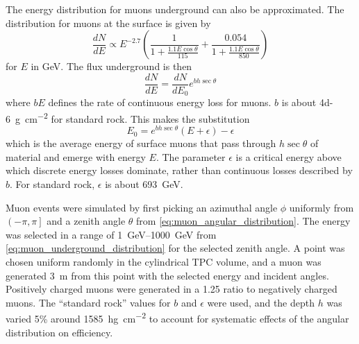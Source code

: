 \documentclass[herrin-thesis.tex]{subfiles}
\begin{document}
The energy distribution for muons underground can also be approximated\cite{Gaisser:1990kx}. The distribution for muons at the surface is given by
\begin{equation}
\label{eq:muon_surface_distribution}
\frac{dN}{dE} \propto E^{-2.7}\left(\frac{1}{1+\frac{1.1 E \cos \theta}{115}} + \frac{0.054}{1+\frac{1.1 E \cos \theta}{850}}\right)
\end{equation}
for \(E\) in \si{\GeV}. The flux underground is then
\begin{equation}
\label{eq:muon_underground_distribution}
\frac{dN}{dE} = \frac{dN}{dE_0}e^{b h \sec \theta}
\end{equation}
where \(b E\) defines the rate of continuous energy loss for muons. \(b\) is about \SI{4d-6}{\g\per\square\cm} for standard rock. This makes the substitution
\begin{equation}
\label{eq:muon_E0_def}
E_0 = e^{b h \sec \theta}\left(E + \epsilon\right) - \epsilon
\end{equation}
which is the average energy of surface muons that pass through \(h\sec\theta\) of material and emerge with energy \(E\). The parameter \(\epsilon\) is a critical energy above which discrete energy losses dominate, rather than continuous losses described by \(b\). For standard rock, \(\epsilon\) is about \SI{693}{\GeV}\cite{groom:2001ys}.

Muon events were simulated by first picking an azimuthal angle \(\phi\) uniformly from \(\left(-\pi, \pi\right]\) and a zenith angle \(\theta\) from \cref{eq:muon_angular_distribution}. The energy was selected in a range of \SIrange{1}{1000}{\GeV} from \cref{eq:muon_underground_distribution} for the selected zenith angle. A point was chosen uniform randomly in the cylindrical TPC volume, and a muon was generated \SI{3}{\meter} from this point with the selected energy and incident angles. Positively charged muons were generated in a 1.25 ratio to negatively charged muons. The ``standard rock'' values for \(b\) and \(\epsilon\) were used, and the depth \(h\) was varied 5\% around \SI{1585}{\hecto\g\per\square\cm} to account for systematic effects of the angular distribution on efficiency.
\end{document}
